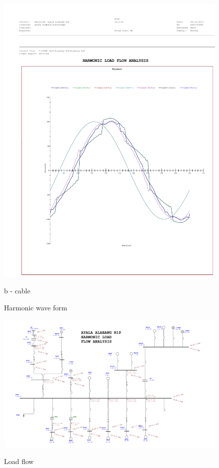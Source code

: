 \begin{figure}
\begin{minipage}[b]{1\linewidth}
		\includegraphics[scale=0.6]{figures/R1P_HA/R1P_HA_cable_waveform}
		\caption*{b - cable}
	\end{minipage}
	\caption{Harmonic wave form}
	\label{fig_ch04_elecaudit_harmonic_waveform}
\end{figure}



\begin{figure}
	\includegraphics[scale=0.7, angle=90]{figures/R1P_HA/fig_ch04_elecaudit_harmonic_load_flow.pdf} \\
	\caption{Load flow}
	\label{fig_ch04_elecaudit_harmonic_load_flow} 
\end{figure}

